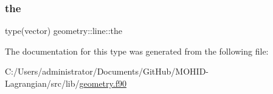 \mbox{\label{structgeometry_1_1line_a5afd4d15030233739e7a7dee4fb8d9cb}} 
\subsubsection{\texorpdfstring{the}{the}}
{\footnotesize\ttfamily type(vector) geometry\+::line\+::the}



The documentation for this type was generated from the following file\+:\begin{DoxyCompactItemize}
\item 
C\+:/\+Users/administrator/\+Documents/\+Git\+Hub/\+M\+O\+H\+I\+D-\/\+Lagrangian/src/lib/\mbox{\hyperlink{geometry_8f90}{geometry.\+f90}}\end{DoxyCompactItemize}
